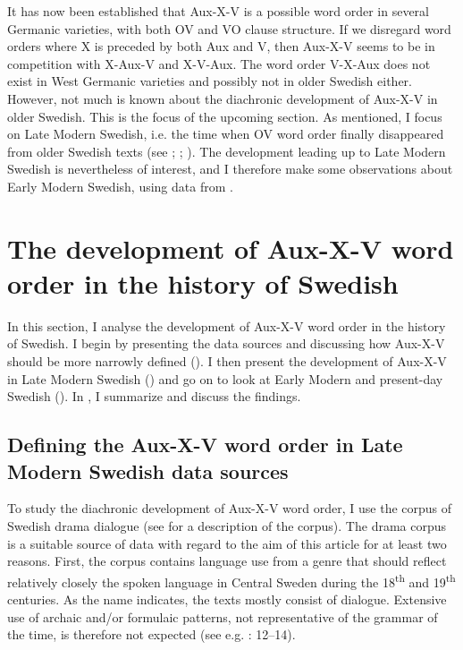 \documentclass[output=paper, colorlinks, citecolor=brown]{langscibook}
\begin{document}
It has now been established that Aux-X-V is a possible word order in several Germanic varieties, with both OV and VO clause structure. If we disregard word orders where X is preceded by both Aux and V, then Aux-X-V seems to be in competition with X-Aux-V and X-V-Aux. The word order V-X-Aux does not exist in West Germanic varieties and possibly not in older Swedish either. However, not much is known about the diachronic development of Aux-X-V in older Swedish. This is the focus of the upcoming section. As mentioned, I focus on Late Modern Swedish, i.e. the time when OV word order finally disappeared from older Swedish texts (see \citealt{Platzack1983}; \citealt{Petzell2011}; \citealt{Sangfelt2019}). The development leading up to Late Modern Swedish is nevertheless of interest, and I therefore make some observations about Early Modern Swedish, using data from \citet{Sangfelt2019}.

\section{The development of Aux-X-V word order in the history of Swedish}\label{sec:sangfelt:4}

In this section, I analyse the development of Aux-X-V word order in the history of Swedish. I begin by presenting the data sources and discussing how Aux-X-V should be more narrowly defined (). I then present the development of Aux-X-V in Late Modern Swedish () and go on to look at Early Modern and present-day Swedish (). In , I summarize and discuss the findings.

\subsection{Defining the Aux-X-V word order in Late Modern Swedish data sources}\label{sec:sangfelt:4.1}

To study the diachronic development of Aux-X-V word order, I use the corpus of Swedish drama dialogue (see \citealt{MarttalaStromquist2001} for a description of the corpus). The drama corpus is a suitable source of data with regard to the aim of this article for at least two reasons. First, the corpus contains language use from a genre that should reflect relatively closely the spoken language in Central Sweden during the 18\textsuperscript{th} and 19\textsuperscript{th} centuries. As the name indicates, the texts mostly consist of dialogue. Extensive use of archaic and/or formulaic patterns, not representative of the grammar of the time, is therefore not expected (see e.g. \citealt{Fischer2007}: 12–14).
\end{document}

